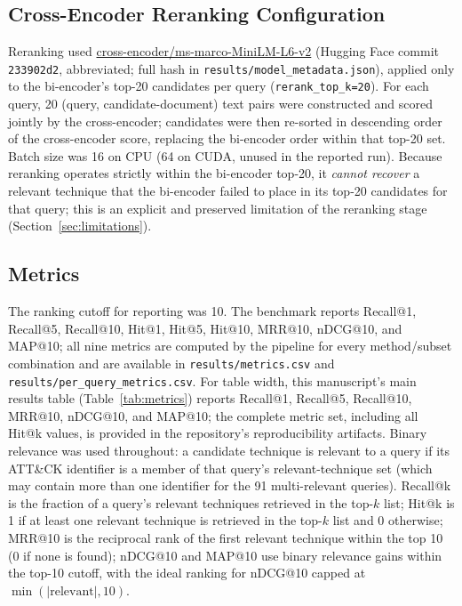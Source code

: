 \documentclass[conference]{IEEEtran}
\begin{document}
\subsection{Cross-Encoder Reranking Configuration}
Reranking used \url{cross-encoder/ms-marco-MiniLM-L6-v2} (Hugging Face commit \texttt{233902d2}, abbreviated; full hash in \texttt{results/model\_metadata.json}), applied only to the bi-encoder's top-20 candidates per query (\texttt{rerank\_top\_k=20}). For each query, 20 (query, candidate-document) text pairs were constructed and scored jointly by the cross-encoder; candidates were then re-sorted in descending order of the cross-encoder score, replacing the bi-encoder order within that top-20 set. Batch size was 16 on CPU (64 on CUDA, unused in the reported run). Because reranking operates strictly within the bi-encoder top-20, it \emph{cannot recover} a relevant technique that the bi-encoder failed to place in its top-20 candidates for that query; this is an explicit and preserved limitation of the reranking stage (Section~\ref{sec:limitations}).

\subsection{Metrics}
The ranking cutoff for reporting was 10. The benchmark reports Recall@1, Recall@5, Recall@10, Hit@1, Hit@5, Hit@10, MRR@10, nDCG@10, and MAP@10; all nine metrics are computed by the pipeline for every method/subset combination and are available in \texttt{results/metrics.csv} and \texttt{results/per\_query\_metrics.csv}. For table width, this manuscript's main results table (Table~\ref{tab:metrics}) reports Recall@1, Recall@5, Recall@10, MRR@10, nDCG@10, and MAP@10; the complete metric set, including all Hit@k values, is provided in the repository's reproducibility artifacts. Binary relevance was used throughout: a candidate technique is relevant to a query if its ATT\&CK identifier is a member of that query's relevant-technique set (which may contain more than one identifier for the 91 multi-relevant queries). Recall@k is the fraction of a query's relevant techniques retrieved in the top-$k$ list; Hit@k is 1 if at least one relevant technique is retrieved in the top-$k$ list and 0 otherwise; MRR@10 is the reciprocal rank of the first relevant technique within the top 10 (0 if none is found); nDCG@10 and MAP@10 use binary relevance gains within the top-10 cutoff, with the ideal ranking for nDCG@10 capped at $\min(|\text{relevant}|, 10)$.
\end{document}
